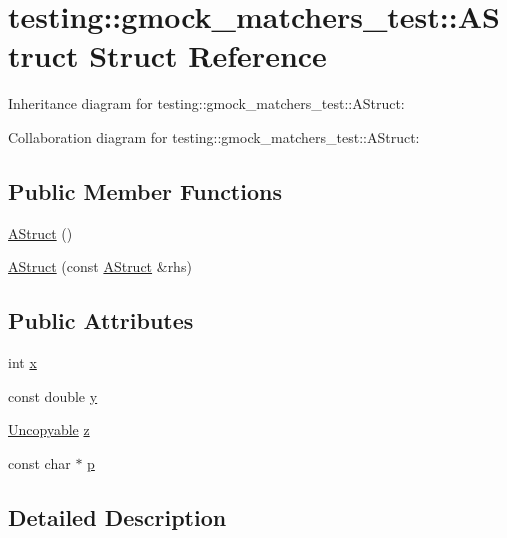 \hypertarget{structtesting_1_1gmock__matchers__test_1_1_a_struct}{}\section{testing\+:\+:gmock\+\_\+matchers\+\_\+test\+:\+:A\+Struct Struct Reference}
\label{structtesting_1_1gmock__matchers__test_1_1_a_struct}


Inheritance diagram for testing\+:\+:gmock\+\_\+matchers\+\_\+test\+:\+:A\+Struct\+:


Collaboration diagram for testing\+:\+:gmock\+\_\+matchers\+\_\+test\+:\+:A\+Struct\+:
\subsection*{Public Member Functions}
\begin{DoxyCompactItemize}
\item 
\hyperlink{structtesting_1_1gmock__matchers__test_1_1_a_struct_a6774561607c8ca64809e9ebde4b62b0e}{A\+Struct} ()
\item 
\hyperlink{structtesting_1_1gmock__matchers__test_1_1_a_struct_ac5b9c0054e929e8883e13123aef50ff3}{A\+Struct} (const \hyperlink{structtesting_1_1gmock__matchers__test_1_1_a_struct}{A\+Struct} \&rhs)
\end{DoxyCompactItemize}
\subsection*{Public Attributes}
\begin{DoxyCompactItemize}
\item 
int \hyperlink{structtesting_1_1gmock__matchers__test_1_1_a_struct_a539eea02599ad34ff2bf90cc2c1adf26}{x}
\item 
const double \hyperlink{structtesting_1_1gmock__matchers__test_1_1_a_struct_a08b8592764aa4775c3d5a3542470f8bb}{y}
\item 
\hyperlink{classtesting_1_1gmock__matchers__test_1_1_uncopyable}{Uncopyable} \hyperlink{structtesting_1_1gmock__matchers__test_1_1_a_struct_a45b1006e4a7b21037610a385dcae6d8c}{z}
\item 
const char $\ast$ \hyperlink{structtesting_1_1gmock__matchers__test_1_1_a_struct_a65755db7d763d53c13483bb520f1efcd}{p}
\end{DoxyCompactItemize}


\subsection{Detailed Description}



